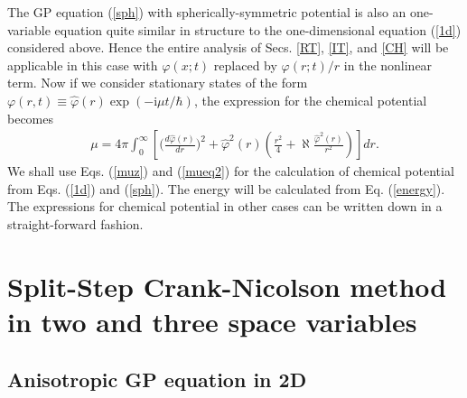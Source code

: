 \documentclass[onecolumn]{elsart3p}
\begin{document}
The GP equation (\ref{sph}) with spherically-symmetric potential  is
also an one-variable equation quite similar in structure to the
one-dimensional equation (\ref{1d}) considered above. Hence the entire
analysis of Secs. \ref{RT}, \ref{IT}, and \ref{CH} will be applicable
in this case
with $\varphi(x;t)$ replaced by $\varphi(r;t)/r$ in the
nonlinear term. Now if we consider stationary states of the form
$\varphi(r,t)\equiv \hat \varphi(r)\exp (-\mbox{i}\mu t/\hbar)$,
 the
expression for the chemical potential
becomes
\begin{align}\label{mueq2}
\mu =4\pi  \int_{0}^\infty \left[\biggr(\frac{d\hat \varphi(r)}{dr}
\biggr)^2 +\hat \varphi^2(r)
\left(
\frac{r^2}{4}+\aleph %
\frac{\hat \varphi^2(r)}{r^2}
\right) \right] dr.
\end{align}
We shall use Eqs. (\ref{muz}) and (\ref{mueq2}) for the calculation of
chemical potential from Eqs. (\ref{1d}) and (\ref{sph}). The energy will
be calculated from Eq. (\ref{energy}).
The expressions
for chemical potential in other cases can be written down in a
straight-forward fashion.


\section{Split-Step Crank-Nicolson method in two and three space
variables}
\label{CN23D}

\subsection{Anisotropic GP equation in 2D}

\label{anp}
\end{document}
